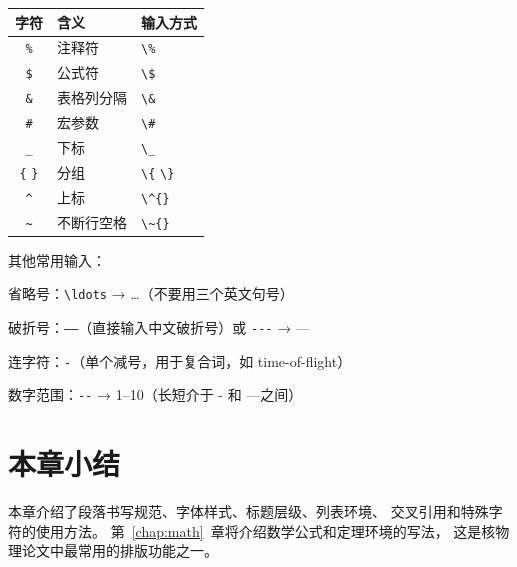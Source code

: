 \begin{table}[H]
\centering
{}
\begin{tabular}{cll}
\hline
字符 & 含义 & 输入方式 \\
\hline
\texttt{\%} & 注释符 & \verb|\%| \\
\texttt{\$} & 公式符 & \verb|\$| \\
\texttt{\&} & 表格列分隔 & \verb|\&| \\
\texttt{\#} & 宏参数 & \verb|\#| \\
\texttt{\_} & 下标 & \verb|\_| \\
\texttt{\{} \texttt{\}} & 分组 & \verb|\{| \verb|\}| \\
\texttt{\^{}} & 上标 & \verb|\^{}| \\
\texttt{\~{}} & 不断行空格 & \verb|\~{}| \\
\hline
\end{tabular}
\end{table}

其他常用输入：
\begin{compactitem}
    \item 省略号：\verb|\ldots| → \ldots （不要用三个英文句号）
    \item 破折号：\verb|——|（直接输入中文破折号）或 \verb|---| → ---
    \item 连字符：\verb|-|（单个减号，用于复合词，如 time-of-flight）
    \item 数字范围：\verb|--| → 1--10（长短介于 - 和 ---之间）
\end{compactitem}

\section{本章小结}

本章介绍了段落书写规范、字体样式、标题层级、列表环境、
交叉引用和特殊字符的使用方法。
第~\ref{chap:math}~章将介绍数学公式和定理环境的写法，
这是核物理论文中最常用的排版功能之一。
